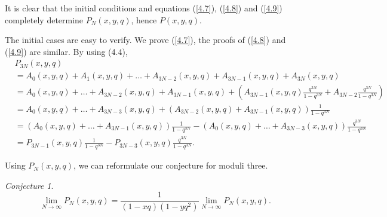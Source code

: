 \documentclass[draft]{amsart}
\numberwithin{equation}{section}
\theoremstyle{plain}
\theoremstyle{remark}
\newtheorem{conjecture}[theorem]{Conjecture}
\begin{document}
It is clear that the initial conditions and equations (\ref{4.7}), (\ref{4.8}) and (\ref{4.9}) completely determine $P_{N}(x,y,q)$, hence $P(x,y,q)$.


 The initial cases are easy to verify. We prove (\ref{4.7}),  the proofs of (\ref{4.8}) and (\ref{4.9}) are similar.
By using (4.4), 
\begin{align*}
&P_{3N}(x,y,q)\\
&=A_{0}(x,y,q)+A_{1}(x,y,q)+\dots+A_{3N-2}(x,y,q)+A_{3N-1}(x,y,q)+A_{3N}(x,y,q)\\
&=A_{0}(x,y,q)+\dots+A_{3N-2}(x,y,q)+A_{3N-1}(x,y,q)+\left(A_{3N-1}(x,y,q)\frac{q^{3N}}{1-q^{3N}}+A_{3N-2}\frac{q^{3N}}{1-q^{3N}}\right)\\
&=A_{0}(x,y,q)+\dots+A_{3N-3}(x,y,q)+\left(A_{3N-2}(x,y,q)+A_{3N-1}(x,y,q)\right)\frac{1}{1-q^{3N}}\\
&=(A_{0}(x,y,q)+\dots+A_{3N-1}(x,y,q))\frac{1}{1-q^{3N}}-\left(A_{0}(x,y,q) +\dots+A_{3N-3} (x,y,q) \right)\frac{q^{3N}}{1-q^{3N}}\\
&=P_{3N-1}(x,y,q)\frac{1}{1-q^{3N}}-P_{3N-3}(x,y,q)\frac{q^{3N}}{1-q^{3N}}.
\end{align*}

Using $P_{N}(x,y,q)$, we can reformulate our conjecture for moduli three.
\begin{conjecture}
$$
\lim_{N\rightarrow \infty}P_{N}(x,y,q)=\frac{1}{(1-xq)(1-yq^{2})}\lim_{N\rightarrow \infty}P_{N}(x,y,q).
$$
\end{conjecture}
\end{document}
